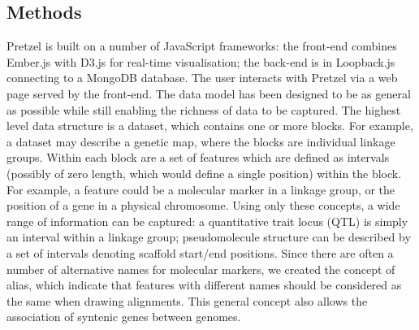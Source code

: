 \documentclass{bioinfo}
\begin{document}
\begin{methods}
\section{Methods}

Pretzel is built on a number of JavaScript frameworks: the front-end combines Ember.js with D3.js for real-time visualisation; the back-end is in Loopback.js connecting to a MongoDB database. 
The user interacts with Pretzel via a web page served by the front-end. 
The data model has been designed to be as general as possible while still enabling the richness of data to be captured. 
The highest level data structure is a dataset, which contains one or more blocks. 
For example, a dataset may describe a genetic map, where the blocks are individual linkage groups. 
Within each block are a set of features which are defined as intervals (possibly of zero length, which would define a single position) within the block. 
For example, a feature could be a molecular marker in a linkage group, or the position of a gene in a physical chromosome. 
Using only these concepts, a wide range of information can be captured: a quantitative trait locus (QTL) is simply an interval within a linkage group; pseudomolecule structure can be described by a set of intervals denoting scaffold start/end positions. 
Since there are often a number of alternative names for molecular markers, we created the concept of alias, which indicate that features with different names should be considered as the same when drawing alignments. 
This general concept also allows the association of syntenic genes between genomes.


\end{methods}
\end{document}
